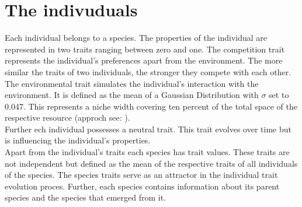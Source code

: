 \documentclass [a4paper]{tufte-book}\usepackage[]{graphicx}\usepackage[]{color}
\begin{document}
\section{The indivuduals}
Each individual belongs to a species. The properties of the individual are represented in two traits ranging between zero and one.
The competition trait represents the individual's preferences apart from the environment. The more similar the traits of two individuals, the stronger they compete with each other.\\
The environmental trait simulates the individual's interaction with the environment. 
It is defined as the mean of a Gaussian Distribution with $\sigma$ set to 0.047. This represents a niche width covering ten percent of the total space of the
respective resource (approch see: \citep{ackermann2004}).\\ Further ech individual
possesses a neutral trait. This trait evolves over time but is influencing the individual's properties.\\
Apart from the individual's traits each species has trait values. These traits are not independent but defined as the mean of the respective traits of all individuals of the species. 
The species traits serve as an attractor in the individual trait evolution proces.
Further, each species contains information about its parent species and the species that emerged from it. 
\end{document}
